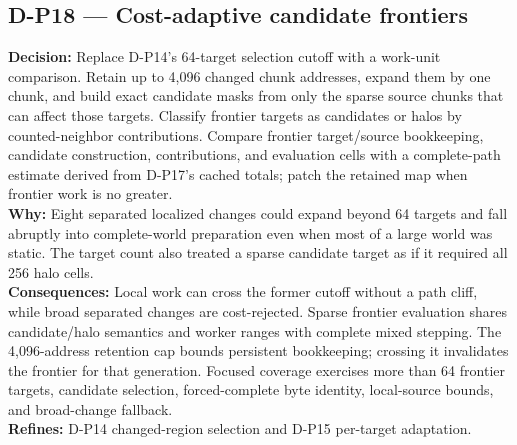 \subsection*{D-P18 --- Cost-adaptive candidate frontiers}
\begin{decisionbox}[title={D-P18 \quad 2026-08-09}]
\textbf{Decision:} Replace D-P14's 64-target selection cutoff with a work-unit
comparison. Retain up to 4,096 changed chunk addresses, expand them by one
chunk, and build exact candidate masks from only the sparse source chunks that
can affect those targets. Classify frontier targets as candidates or halos by
counted-neighbor contributions. Compare frontier target/source bookkeeping,
candidate construction, contributions, and evaluation cells with a
complete-path estimate derived from D-P17's cached totals; patch the retained
map when frontier work is no greater.\\
\textbf{Why:} Eight separated localized changes could expand beyond 64 targets
and fall abruptly into complete-world preparation even when most of a large
world was static. The target count also treated a sparse candidate target as if
it required all 256 halo cells.\\
\textbf{Consequences:} Local work can cross the former cutoff without a path
cliff, while broad separated changes are cost-rejected. Sparse frontier
evaluation shares candidate/halo semantics and worker ranges with complete
mixed stepping. The 4,096-address retention cap bounds persistent bookkeeping;
crossing it invalidates the frontier for that generation. Focused coverage
exercises more than 64 frontier targets, candidate selection, forced-complete
byte identity, local-source bounds, and broad-change fallback.\\
\textbf{Refines:} D-P14 changed-region selection and D-P15 per-target
adaptation.
\end{decisionbox}

